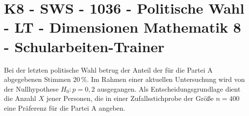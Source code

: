 \section{K8 - SWS - 1036 - Politische Wahl - LT - Dimensionen Mathematik 8 - Schularbeiten-Trainer}

\begin{beispiel}[K8 - SWS]{1}
Bei der letzten politische Wahl betrug der Anteil der für die Partei A abgegebenen Stimmen $20\,\%$. Im Rahmen einer aktuellen Untersuchung wird von der Nullhypothese $H_0\!:p=0,2$ ausgegangen. Als Entscheidungsgrundlage dient die Anzahl $X$ jener Personen, die in einer Zufallsstichprobe der Größe $n=400$ eine Präferenz für die Partei A angeben.

\end{beispiel}